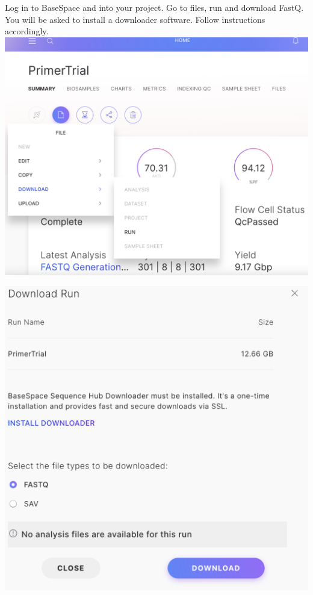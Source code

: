 \documentclass[
]{book}
\begin{document}
Log in to BaseSpace and into your project. Go to files, run and download FastQ. You will be asked to install a downloader software. Follow instructions accordingly.\\
\includegraphics{./img/basespacedownload.png}

\includegraphics{./img/basespacedownload2.png}\\
\strut \\
\end{document}
